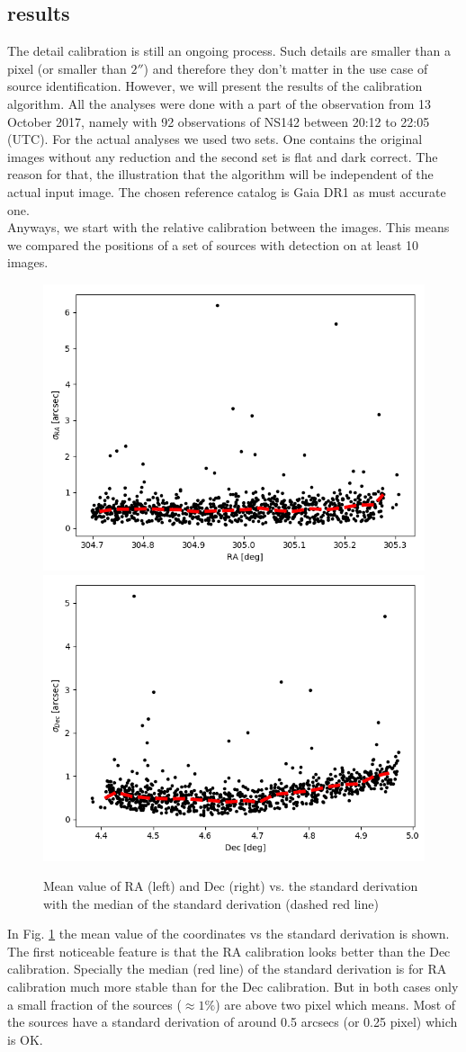 \subsection{results}
The detail calibration is still an ongoing process. Such details are smaller than a pixel (or smaller than $2''$) and therefore they don't matter in the use case of source identification.
However, we will present the results of the calibration algorithm. All the analyses were done with a part of the observation from 13 October 2017, namely with 92 observations of NS142 between 20:12 to 22:05 (UTC). For the actual analyses we used two sets. One contains the original images without any reduction and the second set is flat and dark correct. The reason for that, the illustration that the algorithm will be independent of the actual input image. The chosen reference catalog is Gaia DR1 as must accurate one.\\
Anyways, we start with the relative calibration between the images. This means we compared the positions of a set of sources with detection on at least 10 images.
\begin{figure}
	\includegraphics[width=0.475\linewidth]{./img/ra_delta_ra.png}
	\includegraphics[width=0.475\linewidth]{./img/dec_delta_dec.png}
	\caption{Mean value of RA (left) and Dec (right) vs. the standard derivation with the median of the standard derivation (dashed red line)}
	\label{fig: realtive_coordinates}
\end{figure}
In Fig. \ref{fig: realtive_coordinates} the mean value of the coordinates vs the standard derivation is shown. The first noticeable feature is that the RA calibration looks better than the Dec calibration. Specially the median (red line) of the standard derivation is for RA calibration much more stable than for the Dec calibration. But in both cases only a small fraction of the sources ($\approx 1\%$) are above two pixel which means. Most of the sources have a standard derivation of around 0.5 arcsecs (or 0.25 pixel) which is OK.\\
